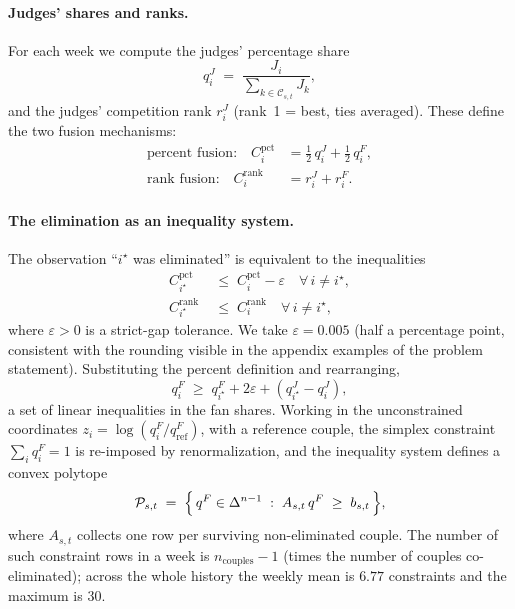 \documentclass{article}
\begin{document}
\paragraph{Judges' shares and ranks.} For each week we compute the judges' percentage
share
\begin{equation}
q^{J}_{i} \;=\; \frac{J_{i}}{\sum_{k\in\mathcal{C}_{s,t}} J_{k}},
\end{equation}
and the judges' competition rank $r^{J}_{i}$ (rank~1 = best, ties averaged). These define
the two fusion mechanisms:
\begin{align}
\text{percent fusion:}\quad C^{\text{pct}}_{i} &= \tfrac12\, q^{J}_{i} + \tfrac12\, q^{F}_{i}, \\
\text{rank fusion:}\quad C^{\text{rank}}_{i} &= r^{J}_{i} + r^{F}_{i}.
\end{align}

\paragraph{The elimination as an inequality system.} The observation ``$i^{\star}$ was
eliminated'' is equivalent to the inequalities
\begin{align}
C^{\text{pct}}_{i^{\star}} &\;\le\; C^{\text{pct}}_{i} - \varepsilon \quad \forall\, i\neq i^{\star}, \label{eq:pctcon}\\
C^{\text{rank}}_{i^{\star}} &\;\le\; C^{\text{rank}}_{i} \quad \forall\, i\neq i^{\star}, \label{eq:rankcon}
\end{align}
where $\varepsilon>0$ is a strict-gap tolerance. We take $\varepsilon=0.005$ (half a
percentage point, consistent with the rounding visible in the appendix examples of the
problem statement). Substituting the percent definition and rearranging,
\begin{equation}
q^{F}_{i} \;\ge\; q^{F}_{i^{\star}} + 2\varepsilon + (q^{J}_{i^{\star}}-q^{J}_{i}),
\end{equation}
a set of linear inequalities in the fan shares. Working in the unconstrained coordinates
$z_{i}=\log(q^{F}_{i}/q^{F}_{\text{ref}})$, with a reference couple, the simplex constraint
$\sum_i q^{F}_i=1$ is re-imposed by renormalization, and the inequality system defines a
convex polytope
\begin{equation}
\mathcal{P}_{s,t} \;=\; \Bigl\{\, q^{F}\in\Delta^{n-1} \;:\; A_{s,t}\, q^{F} \;\ge\; b_{s,t} \,\Bigr\},
\end{equation}
where $A_{s,t}$ collects one row per surviving non-eliminated couple. The number of such
constraint rows in a week is $n_{\text{couples}}-1$ (times the number of couples
co-eliminated); across the whole history the weekly mean is $6.77$ constraints and the
maximum is $30$.
\end{document}
